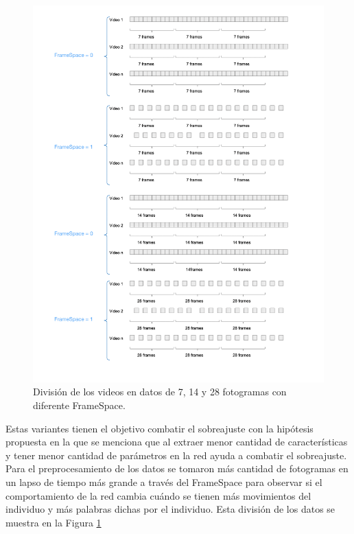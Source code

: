 \begin{onehalfspacing}
\begin{figure}[p]
    	\centering
    	\includegraphics[width=18cm,keepaspectratio]{XX_Figures/Fig_Dataset1_7_14_28F.png}
    	\caption{\small División de los videos en datos de 7, 14 y 28 fotogramas con diferente FrameSpace.}
    	\label{fig:Fig_Dataset1_7_14_28F}
\end{figure}

Estas variantes tienen el objetivo combatir el sobreajuste con la hipótesis propuesta en la que se menciona que al extraer menor cantidad de características y tener menor cantidad de parámetros en la red ayuda a combatir el sobreajuste.\\

Para el preprocesamiento de los datos se tomaron más cantidad de fotogramas en un lapso de tiempo más grande a través del FrameSpace para observar si el comportamiento de la red cambia cuándo se tienen más movimientos del individuo y más palabras dichas por el individuo. Esta división de los datos se muestra en la Figura \ref{fig:Fig_Dataset1_7_14_28F}


\end{onehalfspacing}

